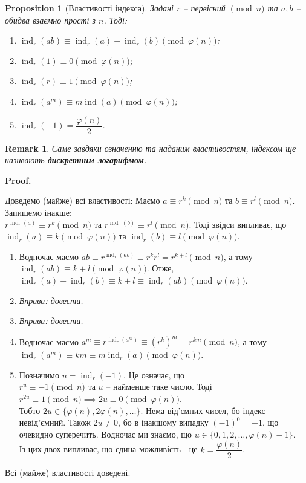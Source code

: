 \documentclass[a4paper, 14pt]{extarticle}
\makeatletter
\theoremstyle{theoremdd}
\theoremstyle{theoremdd}
\theoremstyle{theoremdd}
\theoremstyle{theoremdd}
\theoremstyle{theoremdd}
\newtheorem{proposition}[theorem]{Proposition}
\theoremstyle{theoremdd}
\newtheorem{remark}[theorem]{Remark}
\theoremstyle{theoremdd}
\theoremstyle{theoremdd}
\def\qed{$\blacksquare$}
\renewenvironment{proof}[1][Proof.\\]{\par
\pushQED{\hfill \qed}%
\normalfont \topsep6\p@\@plus6\p@\relax
\trivlist
\item\relax
{\bfseries
#1\@addpunct{.}}\hspace\labelsep\ignorespaces
}{%
\popQED\endtrivlist\@endpefalse
}
\DeclareMathOperator{\ind}{ind}
\makeatother
\begin{document}
\begin{proposition}[Властивості індекса]
Задані $r$ -- первісний $\pmod n$ та $a,b$ -- обидва взаємно прості з $n$. Тоді:
\begin{enumerate}[nosep,wide=0pt,label={\arabic*)}]
\item $\ind_r(ab) \equiv \ind_r(a) + \ind_r(b) \pmod {\varphi(n)}$;
\item $\ind_r (1) \equiv 0 \pmod {\varphi(n)}$;
\item $\ind_r (r) \equiv 1 \pmod {\varphi(n)}$;
\item $\ind_r (a^m) \equiv m \ind (a) \pmod {\varphi(n)}$;
\item $\ind_r(-1) = \dfrac{\varphi(n)}{2}$.
\end{enumerate}
\end{proposition}

\begin{remark}
Саме завдяки означенню та наданим властивостям, індексом ще називають \textbf{дискретним логарифмом}.
\end{remark}

\begin{proof}
Доведемо (майже) всі властивості:
Маємо $a \equiv r^k \pmod n$ та $b \equiv r^l \pmod n$. Запишемо інакше:\\
$r^{\ind_r(a)} \equiv r^k \pmod n$ та $r^{\ind_r(b)} \equiv r^l \pmod n$. Тоді звідси випливає, що\\
$\ind_r(a) \equiv k \pmod {\varphi(n)}$ та $\ind_r(b) \equiv l \pmod {\varphi(n)}$.
\begin{enumerate}[wide=0pt,label={\arabic*)}]
\item Водночас маємо $ab \equiv r^{\ind_r(ab)} \equiv r^k r^l = r^{k+l} \pmod n$, а тому \\ $\ind_r(ab) \equiv k+l \pmod {\varphi(n)}$. Отже,\\
$\ind_r(a) + \ind_r(b) \equiv k+l \equiv \ind_r(ab) \pmod {\varphi(n)}$.

\item \textit{Вправа: довести.} \item \textit{Вправа: довести.}

\item Водночас маємо $a^m \equiv r^{\ind_r(a^m)} \equiv (r^k)^m = r^{km} \pmod n$, а тому \\
$\ind_r(a^m) \equiv km \equiv m \ind_r(a) \pmod {\varphi(n)}$.

\item Позначимо $u = \ind_r(-1)$. Це означає, що \\
$r^u \equiv -1 \pmod n$ та $u$ -- найменше таке число. Тоді\\
$r^{2u} \equiv 1 \pmod n \implies 2u \equiv 0 \pmod {\varphi(n)}$.\\
Тобто $2u \in \{\varphi(n),2\varphi(n),\dots\}$. Нема від'ємних чисел, бо індекс -- невід'ємний. Також $2u \neq 0$, бо в інакшому випадку $(-1)^0 = -1$, що очевидно суперечить. Водночас ми знаємо, що $u \in \{0,1,2,\dots,\varphi(n)-1\}$.\\
Із цих двох випливає, що єдина можливість - це $k = \dfrac{\varphi(n)}{2}$.
\end{enumerate}
Всі (майже) властивості доведені.
\end{proof}
\end{document}
